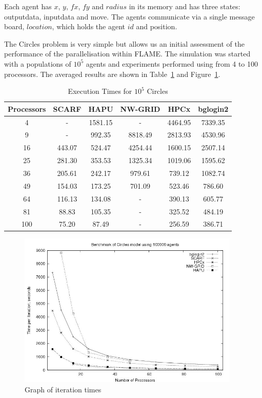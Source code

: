 Each agent has $x$, $y$, $fx$, $fy$ and $radius$ in its memory and has three states: outputdata, inputdata and move. The agents communicate via a single message board, $location$, which holds the agent $id$ and position.

The Circles problem is very simple but allows us an initial assessment of the performance of the parallelisation within FLAME. The simulation was started with a populations of $10^5$  agents and experiments performed using from 4 to 100 processors. The averaged results are shown in Table~\ref{tab:ExecutionTimesForCircles} and Figure~\ref{fig:Circles-graph}.
{
\renewcommand{\arraystretch}{1.25}
\begin{table}[ht]
 \centering
  \begin{tabular}{c|ccccc}
 Processors &SCARF  &HAPU  &NW-GRID &HPCx  &bglogin2 \\ \hline
4 &- &1581.15 &- &4464.95 &7339.35      \\
9 &- &992.35 &8818.49 &2813.93 &4530.96 \\
16 &443.07 &524.47 &4254.44 &1600.15 &2507.14   \\
25 &281.30 &353.53 &1325.34 &1019.06 &1595.62   \\
36 &205.61 &242.17 &979.61 &739.12 &1082.74     \\
49 &154.03 &173.25 &701.09 &523.46 &786.60      \\
64 &116.13 &134.08 &- &390.13 &605.77   \\
81 &88.83 &105.35 &- &325.52 &484.19    \\
100 &75.20 &87.49 &- &256.59 &386.71    \\

 \end{tabular}
 \caption{Execution Times for $10^5$ Circles}
 \label{tab:ExecutionTimesForCircles}
\end{table}
}
\begin{figure}[ht]
 \centering
  \includegraphics[width=300pt]{Circles-graph.jpg}
 \caption{Graph of iteration times}
 \label{fig:Circles-graph}
\end{figure}

